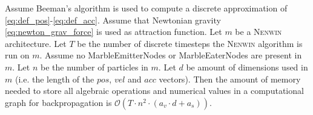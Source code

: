 \begin{lemma}
Assume Beeman's algorithm \cite{beemans_alg} is used to compute a discrete approximation of \eqref{eq:def_pos}-\eqref{eq:def_acc}. Assume that Newtonian gravity \eqref{eq:newton_grav_force} is used as attraction function. Let $m$ be a \textsc{Nenwin} architecture. Let $T$ be the number of discrete timesteps the \textsc{Nenwin} algorithm is run on $m$. Assume no MarbleEmitterNodes or MarbleEaterNodes are present in $m$. Let $n$ be the number of particles in $m$. Let $d$ be amount of dimensions used in $m$ (i.e. the length of the $pos$, $vel$ and $acc$ vectors). 
Then the amount of memory needed to store all algebraic operations and numerical values in a computational graph for backpropagation is $\mathcal{O}(T \cdot n^2 \cdot (a_v \cdot d + a_s))$.
\end{lemma}

